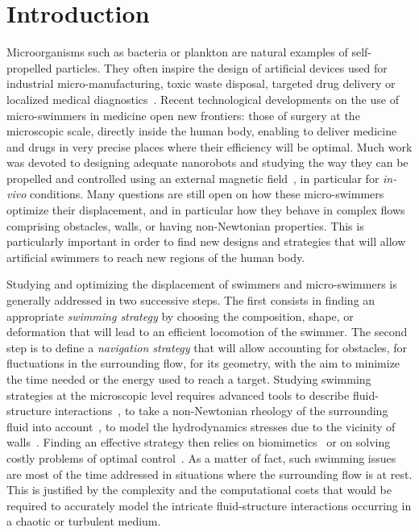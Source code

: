 \documentclass[aps,prl,preprint,groupedaddress]{revtex4-2}
\begin{document}
\section{Introduction}
Microorganisms such as bacteria or plankton are natural examples of self-propelled particles. They often inspire the design of artificial devices used for industrial micro-manufacturing, toxic waste disposal, targeted drug delivery or localized medical diagnostics~\cite{wu2020medical}. Recent technological developments on the use of micro-swimmers in medicine open new frontiers: those of surgery at the microscopic scale, directly inside the human body, enabling to deliver medicine and drugs in very precise places where their efficiency will be optimal. Much work was devoted to designing adequate nanorobots and studying the way they can be propelled and controlled  using an external  magnetic field~\cite{Magneticswim}, in particular for \textit{in-vivo} conditions. Many questions are still open on how these micro-swimmers optimize their displacement, and in particular how they behave in complex flows comprising obstacles, walls, or having non-Newtonian properties. This is particularly important in order to find new designs and strategies that will allow artificial swimmers to reach new regions of the human body.

Studying and optimizing the displacement of swimmers and micro-swimmers is generally addressed in two successive steps. The first consists in finding an appropriate \textit{swimming strategy} by choosing the composition, shape, or deformation that will lead to an efficient locomotion of the swimmer. The second step is to define a \textit{navigation strategy} that will allow accounting for obstacles, for fluctuations in the surrounding flow, for its geometry, with the aim to minimize the time needed or the energy used to reach a target. Studying swimming strategies at the microscopic level requires advanced tools to describe fluid-structure interactions~\cite{berti2020swimming}, to take a non-Newtonian rheology of the surrounding fluid into account~\cite{shen2011undulatory}, to model the hydrodynamics stresses due to the vicinity of walls~\cite{daddi2021hydrodynamics}. Finding an effective strategy then relies on biomimetics~\cite{borazjani2009numerical,cohen2010swimming} or on solving costly problems of optimal control~\cite{alouges2013self}. As a matter of fact, such swimming issues are most of the time addressed in situations where the surrounding flow is at rest. This is justified by the complexity and the computational costs that would be required to accurately model the intricate fluid-structure interactions occurring in a chaotic or turbulent medium. 
\end{document}
